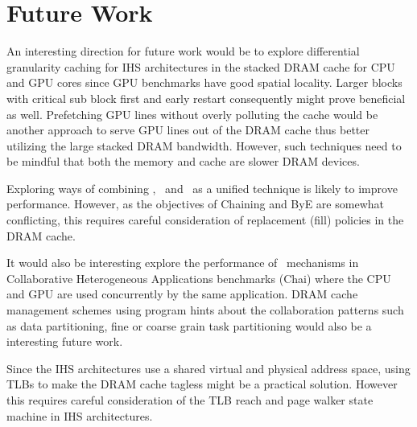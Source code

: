 \section{Future Work}
An interesting direction for future work would be to explore differential granularity caching for IHS architectures in the stacked DRAM cache for CPU and GPU cores since GPU benchmarks have good spatial locality. Larger blocks with critical sub block first and early restart \cite{dram-book} consequently might prove beneficial as well. Prefetching GPU lines without overly polluting the cache would be another approach to serve GPU lines out of the DRAM cache thus better utilizing the large stacked DRAM bandwidth. However, such techniques need to be mindful that both the memory and cache are slower DRAM devices. 
\par Exploring ways of combining \prioname, \chaining\ and \bypassname\ as a unified technique is likely to improve performance. However, as the objectives of Chaining and ByE are somewhat conflicting, this requires careful consideration of replacement (fill) policies in the DRAM cache.
\par It would also be interesting explore the performance of \cachename\ mechanisms in Collaborative Heterogeneous Applications benchmarks (Chai) \cite{chai} where the CPU and GPU are used concurrently by the same application. DRAM cache management schemes using program hints about the collaboration patterns such as data partitioning, fine or coarse grain task partitioning would also be a interesting future work.
\par Since the IHS architectures use a shared virtual and physical address space, using TLBs to make the DRAM cache tagless might be a practical solution. However this requires careful consideration of the TLB reach and page walker state machine in IHS architectures.
